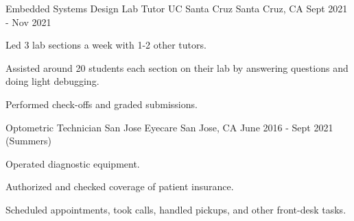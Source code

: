 
\begin{cventries}
  \cventry
    {Embedded Systems Design Lab Tutor} %
    {UC Santa Cruz} %
    {Santa Cruz, CA} %
    {Sept 2021 - Nov 2021} %
    {
      \begin{cvitems} %
        \item {Led 3 lab sections a week with 1-2 other tutors.}
        \item {Assisted around 20 students each section on their lab by answering questions and doing light debugging.}
        \item {Performed check-offs and graded submissions.}
      \end{cvitems}
    }

  \cventry
    {Optometric Technician} %
    {San Jose Eyecare} %
    {San Jose, CA} %
    {June 2016 - Sept 2021 (Summers)} %
    {
      \begin{cvitems} %
        \item {Operated diagnostic equipment.}
        \item {Authorized and checked coverage of patient insurance.}
        \item {Scheduled appointments, took calls, handled pickups, and other front-desk tasks.}
      \end{cvitems}
    }
\end{cventries}
